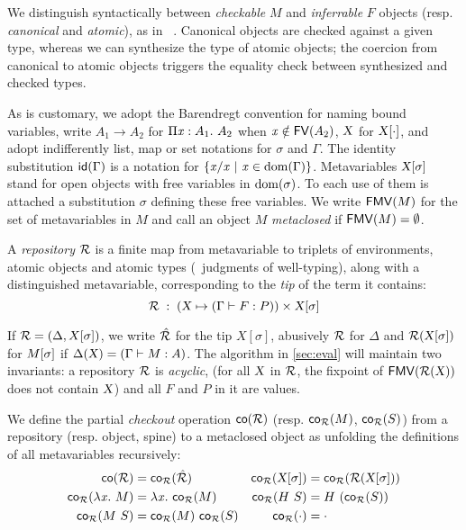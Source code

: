 \documentclass{llncs}
\begin{document}
We distinguish syntactically between \emph{checkable} $M$ and
\emph{inferrable} $F$ objects (resp. \emph{canonical} and
\emph{atomic}), as in \eg\ \cite{pierce2000local}. Canonical objects
are checked against a given type, whereas we can synthesize the type
of atomic objects; the coercion from canonical to atomic objects
triggers the equality check between synthesized and checked types.

As is customary, we adopt the Barendregt convention for naming bound
variables, write $A_1\to A_2$ for $\Pi{\ensuremath{\text{\textit{x}}}}:{A_1}.\  {A_2}$ when $\text{\textit{x}}\notin {\text{\textsf{FV}}}({A_2})$, $\text{\textsl{X}}$ for ${\text{\textsl{X}}}[{\cdot}]$, and adopt
indifferently list, map or set notations for $\sigma$ and
$\Gamma$. The identity substitution ${\text{\textsf{id}}}({\Gamma})$ is a notation
for $\{{\text{\textit{x}}}/{\text{\textit{x}}}\ |\ \text{\textit{x}} \in\operatorname{dom}{\!(\Gamma)}\}$. Metavariables
${\text{\textsl{X}}}[{\sigma}]$ stand for open objects with free variables in
$\operatorname{dom}{\!(\sigma)}$. To each use of them is attached a substitution
$\sigma$ defining these free variables. We write ${\text{\textsf{FMV}}}({M})$ for the set
of metavariables in $M$ and call an object $M$ \emph{metaclosed} if
${\text{\textsf{FMV}}}({M}) = \emptyset$.

\begin{definition}
  A \emph{repository} $\mathcal{R}$ is a finite map from metavariable to
  triplets of environments, atomic objects and atomic types (\ie\
  judgments of well-typing), along with a distinguished metavariable,
  corresponding to the \emph{tip} of the term it contains:
$$ \mathcal{R}\;:\;(\text{\textsl{X}} \mapsto (\Gamma\vdash{F}:{P}))\times{\ensuremath{\text{\textsl{X}}}}[{\sigma}] $$
\end{definition}

If $\mathcal{R} = (\Delta, X[\sigma])$, we write $\hat {\mathcal{R}}$ for the tip
$X[\sigma]$, abusively $\mathcal{R}$ for $\Delta$ and $\mathcal{R} ({\text{\textsl{X}}}[{\sigma}])$
for ${M}[{\sigma}]$ if $\Delta(\text{\textsl{X}}) = (\Gamma\vdash M : A)$.
The algorithm in \ref{sec:eval} will maintain two invariants: a
repository $\mathcal{R}$ is \emph{acyclic}, (for all $\text{\textsl{X}}$ in
$\mathcal{R}$, the fixpoint of ${\text{\textsf{FMV}}}({\mathcal{R}(\text{\textsl{X}})})$ does not contain $\text{\textsl{X}}$) and all $F$ and $P$ in it are values.

\begin{definition}
  We define the partial \emph{checkout} operation ${\text{\textsf{co}}}({\mathcal{R}})$
  (resp. ${\text{\textsf{co$_{\mathcal{R}}$}}}({M})$, ${\text{\textsf{co$_{\mathcal{R}}$}}}({S})$) from a repository
  (resp. object, spine) to a metaclosed object as unfolding the
  definitions of all metavariables recursively:
  \begin{align*}
    {\text{\textsf{co}}}({\mathcal{R}}) &= {\text{\textsf{co$_{\mathcal{R}}$}}}({\hat{\mathcal{R}}}) &
    {\text{\textsf{co$_{\mathcal{R}}$}}}({{\text{\textsl{X}}}[{\sigma}]}) &= {\text{\textsf{co$_{\mathcal{R}}$}}}({\mathcal{R}({\text{\textsl{X}}}[{\sigma}])})\\
    {\text{\textsf{co$_{\mathcal{R}}$}}}({\lambda{\ensuremath{\text{\textit{x}}}}.\  M}) &= \lambda{\ensuremath{\text{\textit{x}}}}.\  {\text{\textsf{co$_{\mathcal{R}}$}}}({M}) &
    {\text{\textsf{co$_{\mathcal{R}}$}}}({{H}\  S}) &= {H}\  {({\text{\textsf{co$_{\mathcal{R}}$}}}({S}))} \\
    {\text{\textsf{co$_{\mathcal{R}}$}}}({{M}\ {S}}) &= {{\text{\textsf{co$_{\mathcal{R}}$}}}({M})}\ {{\text{\textsf{co$_{\mathcal{R}}$}}}({S})} &
    {\text{\textsf{co$_{\mathcal{R}}$}}}({\cdot}) &= \cdot
  \end{align*}
\end{definition}
\end{document}
